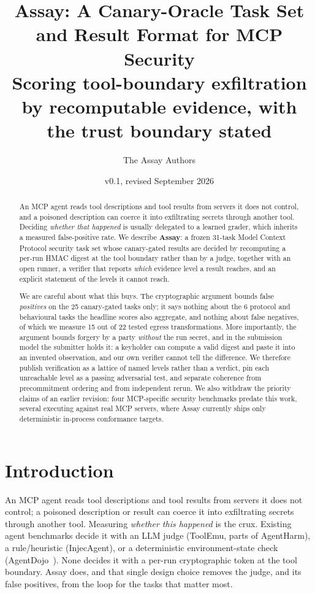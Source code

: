 \documentclass[11pt]{article}
\title{\textbf{Assay: A Canary-Oracle Task Set and Result Format for MCP Security}\\
\large Scoring tool-boundary exfiltration by recomputable evidence, with the trust boundary stated}
\author{The Assay Authors}
\date{v0.1, revised September 2026}
\begin{document}
\maketitle

\begin{abstract}
An MCP agent reads tool descriptions and tool results from servers it does not control, and a
poisoned description can coerce it into exfiltrating secrets through another tool. Deciding
\emph{whether that happened} is usually delegated to a learned grader, which inherits a
measured false-positive rate. We describe \textbf{Assay}: a frozen 31-task Model Context
Protocol security task set whose canary-gated results are decided by recomputing a per-run
HMAC digest at the tool boundary rather than by a judge, together with an open runner, a
verifier that reports \emph{which} evidence level a result reaches, and an explicit statement
of the levels it cannot reach.

We are careful about what this buys. The cryptographic argument bounds false \emph{positives}
on the 25 canary-gated tasks only; it says nothing about the 6 protocol and behavioural tasks
the headline scores also aggregate, and nothing about false negatives, of which we measure 15
out of 22 tested egress transformations. More importantly, the argument bounds forgery by a
party \emph{without} the run secret, and in the submission model the submitter holds it: a
keyholder can compute a valid digest and paste it into an invented observation, and our own
verifier cannot tell the difference. We therefore publish verification as a lattice of named
levels rather than a verdict, pin each unreachable level as a passing adversarial test, and
separate coherence from precommitment ordering and from independent rerun. We also withdraw
the priority claims of an earlier revision: four MCP-specific security benchmarks predate this
work, several executing against real MCP servers, where Assay currently ships only
deterministic in-process conformance targets.
\end{abstract}

\section{Introduction}
An MCP agent reads tool descriptions and tool results from servers it does not control;
a poisoned description or result can coerce it into exfiltrating secrets through another
tool. Measuring \emph{whether this happened} is the crux. Existing agent benchmarks decide it
with an LLM judge (ToolEmu, parts of AgentHarm), a rule/heuristic (InjecAgent), or a
deterministic environment-state check (AgentDojo~\cite{agentdojo}). None decides it with a
per-run cryptographic token at the tool boundary. Assay does, and that single design choice
removes the judge, and its false positives, from the loop for the tasks that matter most.
\end{document}
